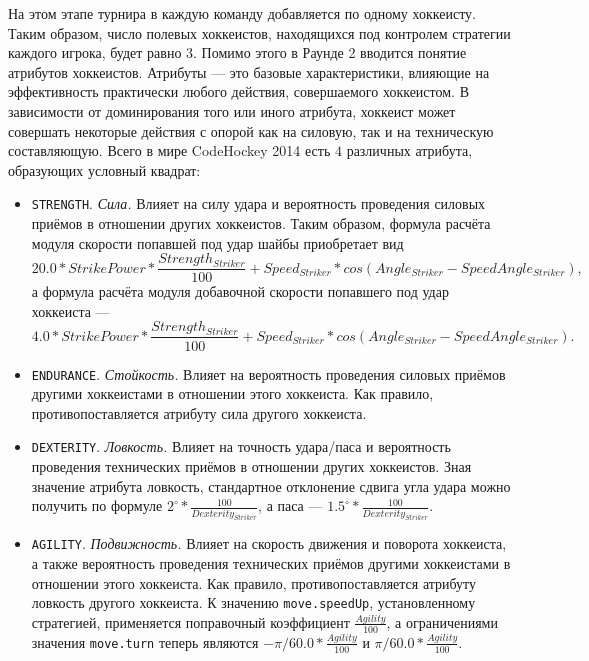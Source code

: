 На этом этапе турнира в каждую команду добавляется по одному хоккеисту. Таким образом, число полевых хоккеистов, находящихся под контролем
стратегии каждого игрока, будет равно $3$. Помимо этого в Раунде 2 вводится понятие атрибутов хоккеистов. Атрибуты --- это базовые
характеристики, влияющие на эффективность практически любого действия, совершаемого хоккеистом. В зависимости от доминирования того или
иного атрибута, хоккеист может совершать некоторые действия с опорой как на силовую, так и на техническую составляющую. Всего в мире
CodeHockey 2014 есть $4$ различных атрибута, образующих условный квадрат:
\begin{itemize}
  \item \texttt{STRENGTH}. \textit{Сила.} Влияет на силу удара и вероятность проведения силовых приёмов в отношении других хоккеистов.
        Таким образом, формула расчёта модуля скорости попавшей под удар шайбы приобретает вид
        \begin{equation}
        20.0*StrikePower*\frac{Strength_{Striker}}{100}+Speed_{Striker}*cos(Angle_{Striker}-SpeedAngle_{Striker}),
        \end{equation}
        а формула расчёта модуля добавочной скорости попавшего под удар хоккеиста ---
        \begin{equation}
        4.0*StrikePower*\frac{Strength_{Striker}}{100}+Speed_{Striker}*cos(Angle_{Striker}-SpeedAngle_{Striker}).
        \end{equation}
  \item \texttt{ENDURANCE}. \textit{Стойкость.} Влияет на вероятность проведения силовых приёмов другими хоккеистами в отношении этого
        хоккеиста. Как правило, противопоставляется атрибуту сила другого хоккеиста.
  \item \texttt{DEXTERITY}. \textit{Ловкость.} Влияет на точность удара/паса и вероятность проведения технических приёмов в отношении других
        хоккеистов. Зная значение атрибута ловкость, стандартное отклонение сдвига угла удара можно получить по формуле
        $2^\circ*\frac{100}{Dexterity_{Striker}}$, а паса --- $1.5^\circ*\frac{100}{Dexterity_{Striker}}$.
  \item \texttt{AGILITY}. \textit{Подвижность.} Влияет на скорость движения и поворота хоккеиста, а также вероятность проведения технических
        приёмов другими хоккеистами в отношении этого хоккеиста. Как правило, противопоставляется атрибуту ловкость другого хоккеиста.
        К значению \texttt{move.speedUp}, установленному стратегией, применяется поправочный коэффициент $\frac{Agility}{100}$, а
        ограничениями значения \texttt{move.turn} теперь являются $-\pi/60.0*\frac{Agility}{100}$ и $\pi/60.0*\frac{Agility}{100}$.
\end{itemize}

